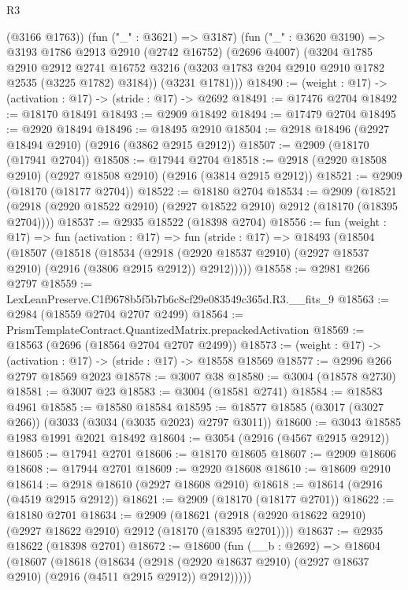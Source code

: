 \begin{lexlean}{R3}
\begin{coremodule}
        (@3166 @1763))
      (fun ("_" : @3621) => @3187)
      (fun ("_" : @3620 @3190) =>
      @3193
        @1786
        @2913
        @2910
        (@2742 @16752)
        (@2696 @4007)
        (@3204
          @1785
          @2910
          @2912
          @2741
          @16752
          @3216
          (@3203 @1783 @204 @2910 @2910 @1782 @2535 (@3225 @1782) @3184))
        (@3231 @1781)))
@18490 := (weight : @17) -> (activation : @17) -> (stride : @17) -> @2692
@18491 := @17476 @2704
@18492 := @18170 @18491
@18493 := @2909 @18492
@18494 := @17479 @2704
@18495 := @2920 @18494
@18496 := @18495 @2910
@18504 := @2918 @18496 (@2927 @18494 @2910) (@2916 (@3862 @2915 @2912))
@18507 := @2909 (@18170 (@17941 @2704))
@18508 := @17944 @2704
@18518 := @2918 (@2920 @18508 @2910) (@2927 @18508 @2910) (@2916 (@3814 @2915 @2912))
@18521 := @2909 (@18170 (@18177 @2704))
@18522 := @18180 @2704
@18534 := @2909
    (@18521 (@2918 (@2920 @18522 @2910) (@2927 @18522 @2910) @2912 (@18170 (@18395 @2704))))
@18537 := @2935 @18522 (@18398 @2704)
@18556 := fun (weight : @17) =>
  fun (activation : @17) =>
  fun (stride : @17) =>
  @18493
    (@18504
      (@18507
        (@18518
          (@18534
            (@2918 (@2920 @18537 @2910) (@2927 @18537 @2910) (@2916 (@3806 @2915 @2912)) @2912)))))
@18558 := @2981 @266 @2797
@18559 := LexLeanPreserve.C1f9678b5f5b7b6c8cf29e083549c365d.R3.__fits_9
@18563 := @2984 (@18559 @2704 @2707 @2499)
@18564 := PrismTemplateContract.QuantizedMatrix.prepackedActivation
@18569 := @18563 (@2696 (@18564 @2704 @2707 @2499))
@18573 := (weight : @17) -> (activation : @17) -> (stride : @17) -> @18558 @18569
@18577 := @2996 @266 @2797 @18569 @2023
@18578 := @3007 @38
@18580 := @3004 (@18578 @2730)
@18581 := @3007 @23
@18583 := @3004 (@18581 @2741)
@18584 := @18583 @4961
@18585 := @18580 @18584
@18595 := @18577 @18585 (@3017 (@3027 @266)) (@3033 (@3034 (@3035 @2023) @2797 @3011))
@18600 := @3043 @18585 @1983 @1991 @2021 @18492
@18604 := @3054 (@2916 (@4567 @2915 @2912))
@18605 := @17941 @2701
@18606 := @18170 @18605
@18607 := @2909 @18606
@18608 := @17944 @2701
@18609 := @2920 @18608
@18610 := @18609 @2910
@18614 := @2918 @18610 (@2927 @18608 @2910)
@18618 := @18614 (@2916 (@4519 @2915 @2912))
@18621 := @2909 (@18170 (@18177 @2701))
@18622 := @18180 @2701
@18634 := @2909
    (@18621 (@2918 (@2920 @18622 @2910) (@2927 @18622 @2910) @2912 (@18170 (@18395 @2701))))
@18637 := @2935 @18622 (@18398 @2701)
@18672 := @18600
    (fun (__b : @2692) =>
    @18604
      (@18607
        (@18618
          (@18634
            (@2918 (@2920 @18637 @2910) (@2927 @18637 @2910) (@2916 (@4511 @2915 @2912)) @2912)))))

\end{coremodule}
\end{lexlean}
